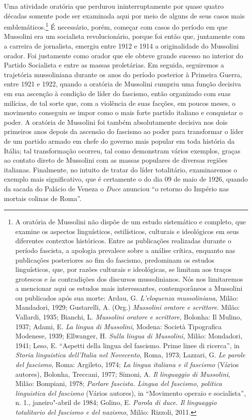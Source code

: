 Uma atividade oratória que perdurou ininterruptamente por quase quatro
décadas somente pode ser examinada aqui por meio de alguns de seus casos
mais emblemáticos.\footnote{A oratória de Mussolini não dispõe de um
  estudo sistemático e completo, que examine os aspectos linguísticos,
  estilísticos, culturais e ideológicos em seus diferentes contextos
  históricos. Entre as publicações realizadas durante o período
  fascista, a apologia prevalece sobre a análise crítica, enquanto nas
  publicações posteriores ao fim do fascismo, predominam os estudos
  linguísticos, que, por razões culturais e ideológicas, se limitam aos
  traços grotescos e às contradições dos discursos mussolinianos. Nós
  nos limitaremos a mencionar aqui os estudos mais interessantes,
  contemporâneos a Mussolini ou publicados após sua morte: Ardau, G.
  \emph{L'eloquenza mussoliniana}, Milão: Mandadori, 1929; Gustarelli,
  A. (Org.) \emph{Mussolini oratore e scrittore}. Milão: Vallardi, 1935;
  Bianchi, L. \emph{Mussolini oratore e scrittore}, Bolonha: Il Mulino,
  1937; Adami, E. \emph{La lingua di Mussolini}, Modena: Società
  Tipografica Modenese, 1939; Ellwanger, H. \emph{Sulla lingua di
  Mussolini}, Milão: Mondadori, 1941; Leso, E. ``Aspetti della lingua
  del fascismo. Prime linee di ricerca'', in \emph{Storia linguistica
  dell'Italia nel Novecento}, Roma, 1973; Lazzari, G. \emph{Le parole
  del fascismo}, Roma: Argileto, 1974; \emph{La lingua italiana e il
  fascismo} (Vários autores), Bolonha, Treccani, 1977; Simoni, A.
  \emph{Il linguaggio di Mussolini}, Milão: Bompiani, 1978;
  \emph{Parlare fascista. Lingua del fascismo, politica linguistica del
  fascismo} (Vários autores), in ``Movimento operaio e socialista'', n.
  1., janeiro"-abril de 1984; Golino, E. \emph{Parola di duce. Il
  linguaggio totalitario del fascismo e del nazismo}, Milão: Rizzoli,
  2011.} É necessário, porém, começar com casos do período em que
Mussolini era um socialista revolucionário, porque foi então que,
juntamente com a carreira de jornalista, emergiu entre 1912 e 1914 a
originalidade do Mussolini orador. Foi justamente como orador que ele
obteve grande sucesso no interior do Partido Socialista e entre as
massas proletárias. Em seguida, seguiremos a trajetória mussoliniana
durante os anos do período posterior à Primeira Guerra, entre 1921 e
1922, quando a oratória de Mussolini cumpriu uma função decisiva em sua
ascenção à condição de líder do fascismo, então organizado com suas
milícias, de tal sorte que, com a violência de suas facções, em poucos
meses, o movimento conseguiu se impor como o mais forte partido italiano
e conquistar o poder. A oratória de Mussolini foi também absolutamente
decisiva nos dois primeiros anos depois da ascensão do fascismo ao poder
para transformar o líder de um partido armado em chefe do governo mais
popular em toda história da Itália; tal transformação ocorreu, tal como
demonstram vários exemplos, graças ao contato direto de Mussolini com as
massas populares de diversas regiões italianas. Finalmente, no intuito
de tratar do líder totalitário, examinaremos o exemplo mais
significativo, que é certamente o do dia 09 de maio de 1926, quando da
sacada do Palácio de Veneza o \emph{Duce} anunciou ``o retorno do
Império nas mortais colinas de Roma''.

